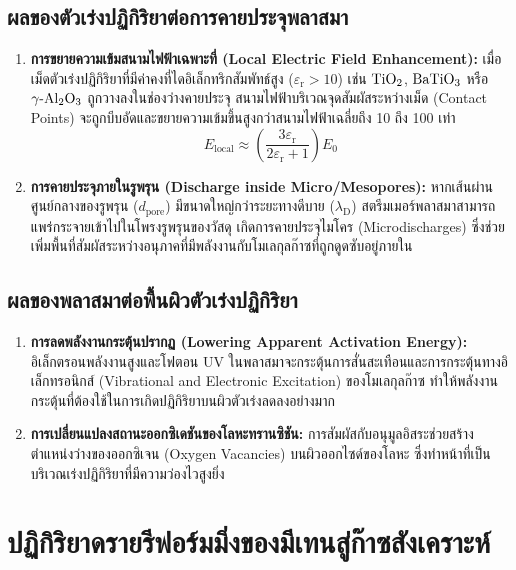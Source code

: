 \subsection{ผลของตัวเร่งปฏิกิริยาต่อการคายประจุพลาสมา}
\begin{enumerate}
    \item \textbf{การขยายความเข้มสนามไฟฟ้าเฉพาะที่ (Local Electric Field Enhancement):} เมื่อเม็ดตัวเร่งปฏิกิริยาที่มีค่าคงที่ไดอิเล็กทริกสัมพัทธ์สูง ($\varepsilon_{\text{r}} > 10$) เช่น $\ce{TiO2}$, $\ce{BaTiO3}$ หรือ $\ce{\gamma-Al2O3}$ ถูกวางลงในช่องว่างคายประจุ สนามไฟฟ้าบริเวณจุดสัมผัสระหว่างเม็ด (Contact Points) จะถูกบีบอัดและขยายความเข้มขึ้นสูงกว่าสนามไฟฟ้าเฉลี่ยถึง 10 ถึง 100 เท่า
    \begin{equation}
        E_{\text{local}} \approx \left( \frac{3 \varepsilon_{\text{r}}}{2 \varepsilon_{\text{r}} + 1} \right) E_0
        \label{eq:field_enhancement}
    \end{equation}
    
    \item \textbf{การคายประจุภายในรูพรุน (Discharge inside Micro/Mesopores):} หากเส้นผ่านศูนย์กลางของรูพรุน ($d_{\text{pore}}$) มีขนาดใหญ่กว่าระยะทางดีบาย ($\lambda_{\text{D}}$) สตรีมเมอร์พลาสมาสามารถแพร่กระจายเข้าไปในโพรงรูพรุนของวัสดุ เกิดการคายประจุไมโคร (Microdischarges) ซึ่งช่วยเพิ่มพื้นที่สัมผัสระหว่างอนุภาคที่มีพลังงานกับโมเลกุลก๊าซที่ถูกดูดซับอยู่ภายใน
\end{enumerate}

\subsection{ผลของพลาสมาต่อพื้นผิวตัวเร่งปฏิกิริยา}
\begin{enumerate}
    \item \textbf{การลดพลังงานกระตุ้นปรากฏ (Lowering Apparent Activation Energy):} อิเล็กตรอนพลังงานสูงและโฟตอน UV ในพลาสมาจะกระตุ้นการสั่นสะเทือนและการกระตุ้นทางอิเล็กทรอนิกส์ (Vibrational and Electronic Excitation) ของโมเลกุลก๊าซ ทำให้พลังงานกระตุ้นที่ต้องใช้ในการเกิดปฏิกิริยาบนผิวตัวเร่งลดลงอย่างมาก
    \item \textbf{การเปลี่ยนแปลงสถานะออกซิเดชันของโลหะทรานซิชัน:} การสัมผัสกับอนุมูลอิสระช่วยสร้างตำแหน่งว่างของออกซิเจน (Oxygen Vacancies) บนผิวออกไซด์ของโลหะ ซึ่งทำหน้าที่เป็นบริเวณเร่งปฏิกิริยาที่มีความว่องไวสูงยิ่ง
\end{enumerate}

\section{ปฏิกิริยาดรายรีฟอร์มมิ่งของมีเทนสู่ก๊าซสังเคราะห์}

